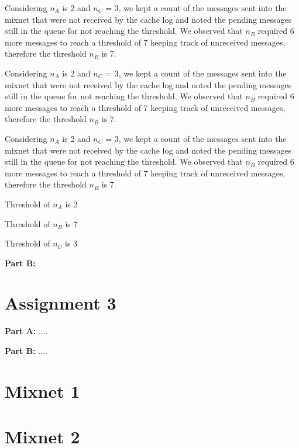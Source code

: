 \documentclass[preprint,12pt,3p]{elsarticle}
\begin{document}
\begin{flushleft}
\newline
Considering $n_A$ is 2 and $n_C$ = 3, we kept a count of the messages sent into the mixnet that were not received by the cache log and noted the pending messages still in the queue for not reaching the threshold. We observed that $n_B$ required 6 more messages to reach a threshold of 7 keeping  track of unreceived messages, therefore the threshold $n_B$ is 7. 

\newline
Considering $n_A$ is 2 and $n_C$ = 3, we kept a count of the messages sent into the mixnet that were not received by the cache log and noted the pending messages still in the queue for not reaching the threshold. We observed that $n_B$ required 6 more messages to reach a threshold of 7 keeping  track of unreceived messages, therefore the threshold $n_B$ is 7. 

\newline
Considering $n_A$ is 2 and $n_C$ = 3, we kept a count of the messages sent into the mixnet that were not received by the cache log and noted the pending messages still in the queue for not reaching the threshold. We observed that $n_B$ required 6 more messages to reach a threshold of 7 keeping  track of unreceived messages, therefore the threshold $n_B$ is 7. 

\begin{center}
Threshold of $n_A$ is 2

Threshold of $n_B$ is 7

Threshold of $n_C$ is 3
\end{center}




\textbf{Part B:}

\section*{Assignment 3}
\textbf{Part A:}
....
\newline


\textbf{Part B:}
....
\newline

\end{flushleft}

\appendix

\section{Mixnet 1}
\section{Mixnet 2}
\end{document}

